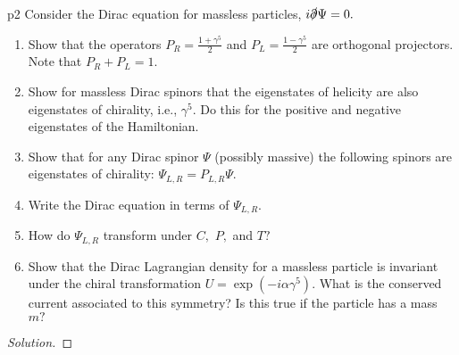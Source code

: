 \begin{problem}{}{p2}
   Consider the Dirac equation for massless particles, \(i \slashed{\partial} \Psi = 0.\)
   \begin{enumerate}[label=(\alph*)]
      \item Show that the operators \(P_R = \frac{1 + \gamma^5}{2}\) and \(P_L = \frac{1 - \gamma^5}{2}\) are orthogonal projectors. Note that \(P_R + P_L = 1.\)
      \item Show  for massless Dirac spinors that the eigenstates of helicity are also eigenstates of chirality, i.e., \(\gamma^5\). Do this for the positive and negative eigenstates of the Hamiltonian.
      \item Show that for any Dirac spinor \(\Psi\) (possibly massive) the following spinors are eigenstates of chirality: \(\Psi_{L,R} = P_{L,R} \Psi.\)
      \item Write the Dirac equation in terms of \(\Psi_{L,R}.\)
      \item How do \(\Psi_{L,R}\) transform under \(C,\) \(P,\) and \(T?\)
      \item Show that the Dirac Lagrangian density for a massless particle is invariant under the chiral transformation \(U = \exp(-i \alpha \gamma^5)\). What is the conserved current associated to this symmetry? Is this true if the particle has a mass \(m?\)
   \end{enumerate}
\end{problem}
\begin{proof}[Solution]
\end{proof}
